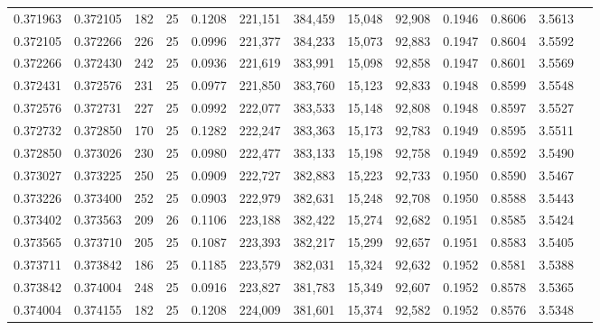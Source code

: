\begin{tabular}{rrrrrrrrrrrrr}
0.371963 & 0.372105 &   182 &  25 &                                     0.1208 & 221,151 & 384,459 &  15,048 &  92,908 & 0.1946 & 0.8606 & 3.5613 \\
0.372105 & 0.372266 &   226 &  25 &                                     0.0996 & 221,377 & 384,233 &  15,073 &  92,883 & 0.1947 & 0.8604 & 3.5592 \\
0.372266 & 0.372430 &   242 &  25 &                                     0.0936 & 221,619 & 383,991 &  15,098 &  92,858 & 0.1947 & 0.8601 & 3.5569 \\
0.372431 & 0.372576 &   231 &  25 &                                     0.0977 & 221,850 & 383,760 &  15,123 &  92,833 & 0.1948 & 0.8599 & 3.5548 \\
0.372576 & 0.372731 &   227 &  25 &                                     0.0992 & 222,077 & 383,533 &  15,148 &  92,808 & 0.1948 & 0.8597 & 3.5527 \\
0.372732 & 0.372850 &   170 &  25 &                                     0.1282 & 222,247 & 383,363 &  15,173 &  92,783 & 0.1949 & 0.8595 & 3.5511 \\
0.372850 & 0.373026 &   230 &  25 &                                     0.0980 & 222,477 & 383,133 &  15,198 &  92,758 & 0.1949 & 0.8592 & 3.5490 \\
0.373027 & 0.373225 &   250 &  25 &                                     0.0909 & 222,727 & 382,883 &  15,223 &  92,733 & 0.1950 & 0.8590 & 3.5467 \\
0.373226 & 0.373400 &   252 &  25 &                                     0.0903 & 222,979 & 382,631 &  15,248 &  92,708 & 0.1950 & 0.8588 & 3.5443 \\
0.373402 & 0.373563 &   209 &  26 &                                     0.1106 & 223,188 & 382,422 &  15,274 &  92,682 & 0.1951 & 0.8585 & 3.5424 \\
0.373565 & 0.373710 &   205 &  25 &                                     0.1087 & 223,393 & 382,217 &  15,299 &  92,657 & 0.1951 & 0.8583 & 3.5405 \\
0.373711 & 0.373842 &   186 &  25 &                                     0.1185 & 223,579 & 382,031 &  15,324 &  92,632 & 0.1952 & 0.8581 & 3.5388 \\
0.373842 & 0.374004 &   248 &  25 &                                     0.0916 & 223,827 & 381,783 &  15,349 &  92,607 & 0.1952 & 0.8578 & 3.5365 \\
0.374004 & 0.374155 &   182 &  25 &                                     0.1208 & 224,009 & 381,601 &  15,374 &  92,582 & 0.1952 & 0.8576 & 3.5348 \\

\end{tabular}
